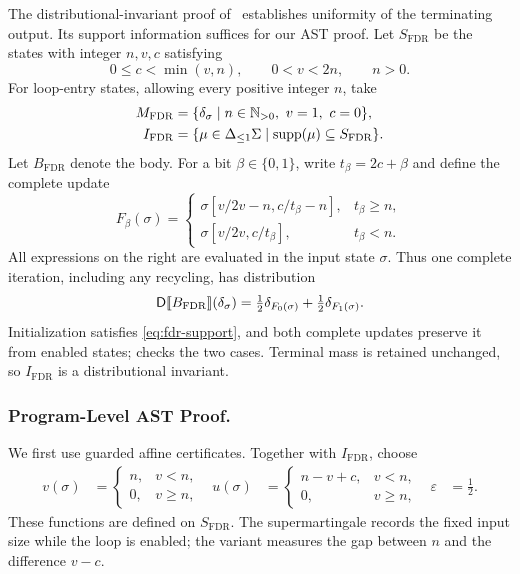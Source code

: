 The distributional-invariant proof
of~\cite{zilken2026verifyingsamplingalgorithmsdistributional} establishes
uniformity of the terminating output. Its support information suffices
for our AST proof. Let $S_{\mathrm{FDR}}$ be the states with integer
$n,v,c$ satisfying
\begin{equation}
 0\leq c<\min(v,n),\qquad 0<v<2n,\qquad n>0.
 \label{eq:fdr-support}
\end{equation}
For loop-entry states, allowing every positive integer $n$, take
\[
 \begin{aligned}
 M_{\mathrm{FDR}}
 &=\{\delta_{\sigma}\mid n\in\mathbb N_{>0},\ v=1,\ c=0\},\\
 I_{\mathrm{FDR}}
 &=\{\mu\in{\Delta_{\leq 1}\Sigma}\mid\textnormal{supp}(\mu)\subseteq S_{\mathrm{FDR}}\}.
 \end{aligned}
\]
Let $B_{\mathrm{FDR}}$ denote the body. For a bit $\beta\in\{0,1\}$,
write $t_\beta=2c+\beta$ and define the complete update
\[
 F_\beta(\sigma)=
 \begin{cases}
   \sigma[v/2v-n,c/t_\beta-n],&t_\beta\geq n,\\
   \sigma[v/2v,c/t_\beta],&t_\beta<n.
 \end{cases}
\]
All expressions on the right are evaluated in the input state $\sigma$.
Thus one complete iteration, including any recycling, has distribution
\begin{equation}
 \mathsf{D}\llbracket B_{\mathrm{FDR}}\rrbracket(\delta_{\sigma})
 =\tfrac12\delta_{F_0(\sigma)}+\tfrac12\delta_{F_1(\sigma)}.
 \label{eq:fdr-post}
\end{equation}
Initialization satisfies \eqref{eq:fdr-support}, and both complete
updates preserve it from enabled states; 
checks the two cases. Terminal mass is retained unchanged, so
$I_{\mathrm{FDR}}$ is a distributional invariant.

\subsubsection{Program-Level AST Proof.}
We first use guarded affine certificates. Together with $I_{\mathrm{FDR}}$,
choose
\begin{equation}
 \begin{aligned}
 v(\sigma)&=\begin{cases}n,&v<n,\\0,&v\geq n,\end{cases}
 &u(\sigma)&=\begin{cases}n-v+c,&v<n,\\0,&v\geq n,\end{cases}
 &\varepsilon&=\tfrac12.
 \end{aligned}
 \label{eq:fdr-affine-certificates}
\end{equation}
These functions are defined on $S_{\mathrm{FDR}}$. The supermartingale
records the fixed input size while the loop is enabled; the variant
measures the gap between $n$ and the difference $v-c$.

